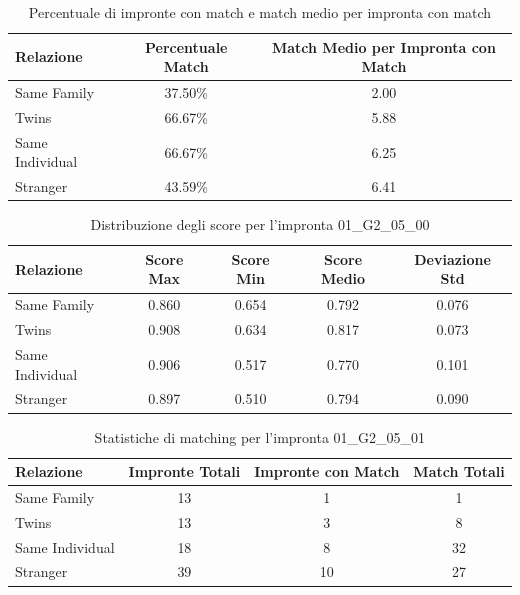 \begin{table}[htbp]
\centering
\caption{Percentuale di impronte con match e match medio per impronta con match}
\label{tab:match_percentage_01_G2_05_00}
\begin{tabular}{|l|c|c|}
\hline
\textbf{Relazione} & \textbf{Percentuale Match} & \textbf{Match Medio per Impronta con Match} \\
\hline
Same Family & 37.50\% & 2.00 \\
\hline
Twins & 66.67\% & 5.88 \\
\hline
Same Individual & 66.67\% & 6.25 \\
\hline
Stranger & 43.59\% & 6.41 \\
\hline
\end{tabular}
\end{table}


\begin{table}[htbp]
\centering
\caption{Distribuzione degli score per l'impronta 01\_G2\_05\_00}
\label{tab:scores_01_G2_05_00}
\begin{tabular}{|l|c|c|c|c|}
\hline
\textbf{Relazione} & \textbf{Score Max} & \textbf{Score Min} & \textbf{Score Medio} & \textbf{Deviazione Std} \\
\hline
Same Family & 0.860 & 0.654 & 0.792 & 0.076 \\
\hline
Twins & 0.908 & 0.634 & 0.817 & 0.073 \\
\hline
Same Individual & 0.906 & 0.517 & 0.770 & 0.101 \\
\hline
Stranger & 0.897 & 0.510 & 0.794 & 0.090 \\
\hline
\end{tabular}
\end{table}


\begin{table}[htbp]
\centering
\caption{Statistiche di matching per l'impronta 01\_G2\_05\_01}
\label{tab:results_01_G2_05_01}
\begin{tabular}{|l|c|c|c|}
\hline
\textbf{Relazione} & \textbf{Impronte Totali} & \textbf{Impronte con Match} & \textbf{Match Totali} \\
\hline
Same Family & 13 & 1 & 1 \\
\hline
Twins & 13 & 3 & 8 \\
\hline
Same Individual & 18 & 8 & 32 \\
\hline
Stranger & 39 & 10 & 27 \\
\hline
\end{tabular}
\end{table}


